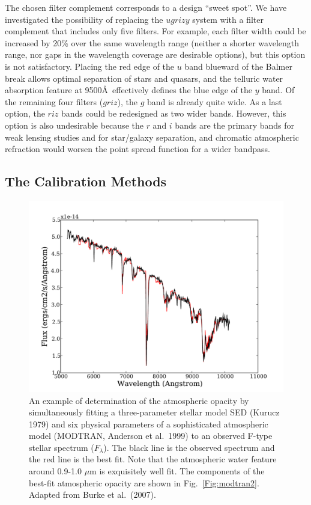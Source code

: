 \documentclass{emulateapj}
\begin{document}
The chosen filter complement corresponds to a design ``sweet spot''. We have 
investigated the possibility of replacing the $ugrizy$ system with a
filter complement that includes only five filters. For example, each filter
width could be increased by 20\% over the same wavelength range (neither a
shorter wavelength range, nor gaps in the wavelength coverage are desirable 
options), but this option is not satisfactory. Placing the red edge of the $u$ 
band blueward of the Balmer break allows optimal separation of stars and
quasars, and the telluric water absorption feature at 9500\AA\
effectively defines the blue edge of the $y$ band. Of the remaining four
filters ($griz$), the $g$ band is already quite wide. As a last option, the 
$riz$ bands could be redesigned as two wider bands. However, this option is also 
undesirable because the $r$ and $i$ bands are the primary bands for weak
lensing studies and for star/galaxy separation, and chromatic atmospheric
refraction would worsen the point spread function for a wider bandpass. 



\subsection{ The Calibration Methods }


\begin{figure}
\hskip -0.12in
\includegraphics[width=1.1\hsize,clip]{modtran1.pdf}
\caption{An example of determination of the atmospheric opacity by 
simultaneously fitting a three-parameter stellar model SED (Kurucz 1979) and 
six physical parameters of a sophisticated atmospheric model (MODTRAN, Anderson 
et al.~1999) to an observed F-type stellar spectrum ($F_\lambda$). The black 
line is the observed spectrum and the red line is the best fit. Note that the 
atmospheric water feature around 0.9-1.0 $\mu$m is exquisitely well fit. 
The components of the best-fit atmospheric opacity are shown in 
Fig.~\ref{Fig:modtran2}. Adapted from Burke et al.~(2007).}
\label{Fig:modtran1}
\end{figure}
\end{document}
